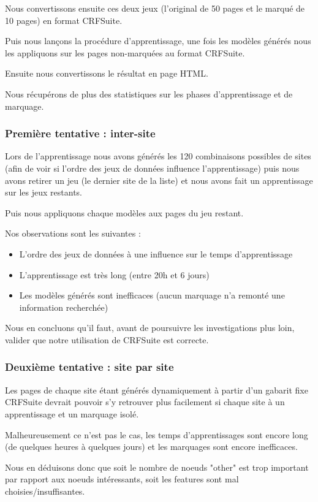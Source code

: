 \documentclass{article}
\begin{document}
Nous convertissons ensuite ces deux jeux (l'original de 50 pages et le marqué de 10
pages) en format CRFSuite.

Puis nous lançons la procédure d'apprentissage, une fois les modèles générés
nous les appliquons sur les pages non-marquées au format CRFSuite.

Ensuite nous convertissons le résultat en page HTML.

Nous récupérons de plus des statistiques sur les phases d'apprentissage et de
marquage.

\subsubsection{Première tentative : inter-site}
Lors de l'apprentissage nous avons générés les 120 combinaisons possibles de sites
(afin de voir si l'ordre des jeux de données influence l'apprentissage)
puis nous avons retirer un jeu (le dernier site de la liste) et nous avons fait
un apprentissage sur les jeux restants.

Puis nous appliquons chaque modèles aux pages du jeu restant.

Nos observations sont les suivantes :

\begin{itemize}
 \item L'ordre des jeux de données à une influence sur le temps d'apprentissage
 \item L'apprentissage est très long (entre 20h et 6 jours)
 \item Les modèles générés sont inefficaces (aucun marquage n'a remonté une information recherchée)
\end{itemize}

Nous en concluons qu'il faut, avant de poursuivre les investigations plus loin,
valider que notre utilisation de CRFSuite est correcte.

\subsubsection{Deuxième tentative : site par site}
Les pages de chaque site étant générés dynamiquement à partir d'un gabarit fixe
CRFSuite devrait pouvoir s'y retrouver plus facilement si chaque site à un apprentissage
et un marquage isolé.

Malheureusement ce n'est pas le cas, les temps d'apprentissages sont encore long (de
quelques heures à quelques jours) et les marquages sont encore inefficaces.

Nous en déduisons donc que soit le nombre de noeuds "other" est trop important par
rapport aux noeuds intéressants, soit les features sont mal choisies/insuffisantes.
\end{document}
